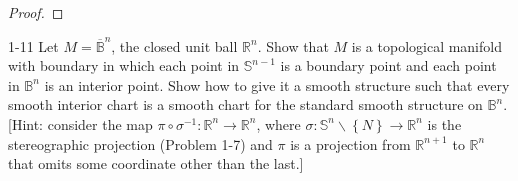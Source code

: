 \begin{proof}
\end{proof}

\begin{problem}{1-11}
    Let \( M = \overline{\mathbb{B}}^{n} \), the closed unit ball \( \mathbb{R}^{n} \). Show that \( M \) is a topological manifold with boundary in which each point in \( \mathbb{S}^{n-1} \) is a boundary point and each point in \( \mathbb{B}^{n} \) is an interior point. Show how to give it a smooth structure such that every smooth interior chart is a smooth chart for the standard smooth structure on \( \mathbb{B}^{n} \). [Hint: consider the map \( \pi \circ \sigma^{-1}: \mathbb{R}^{n} \to \mathbb{R}^{n} \), where \( \sigma: \mathbb{S}^{n} \smallsetminus \left\{ N \right\} \to \mathbb{R}^{n} \) is the stereographic projection (Problem 1-7) and \( \pi \) is a projection from \( \mathbb{R}^{n+1} \) to \( \mathbb{R}^{n} \) that omits some coordinate other than the last.]
\end{problem}

